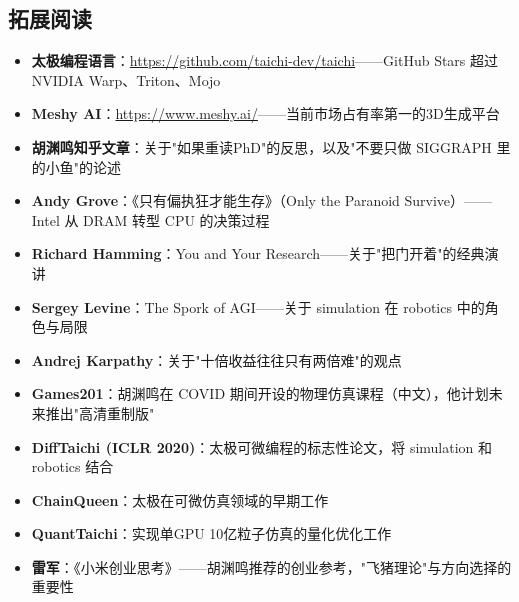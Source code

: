 \subsection{拓展阅读}

\begin{itemize}
\item \textbf{太极编程语言}：\url{https://github.com/taichi-dev/taichi}——GitHub Stars 超过 NVIDIA Warp、Triton、Mojo
\item \textbf{Meshy AI}：\url{https://www.meshy.ai/}——当前市场占有率第一的3D生成平台
\item \textbf{胡渊鸣知乎文章}：关于"如果重读PhD"的反思，以及"不要只做 SIGGRAPH 里的小鱼"的论述
\item \textbf{Andy Grove}：《只有偏执狂才能生存》（Only the Paranoid Survive）——Intel 从 DRAM 转型 CPU 的决策过程
\item \textbf{Richard Hamming}：You and Your Research——关于"把门开着"的经典演讲
\item \textbf{Sergey Levine}：The Spork of AGI——关于 simulation 在 robotics 中的角色与局限
\item \textbf{Andrej Karpathy}：关于"十倍收益往往只有两倍难"的观点
\item \textbf{Games201}：胡渊鸣在 COVID 期间开设的物理仿真课程（中文），他计划未来推出"高清重制版"
\item \textbf{DiffTaichi (ICLR 2020)}：太极可微编程的标志性论文，将 simulation 和 robotics 结合
\item \textbf{ChainQueen}：太极在可微仿真领域的早期工作
\item \textbf{QuantTaichi}：实现单GPU 10亿粒子仿真的量化优化工作
\item \textbf{雷军}：《小米创业思考》——胡渊鸣推荐的创业参考，"飞猪理论"与方向选择的重要性
\end{itemize}



